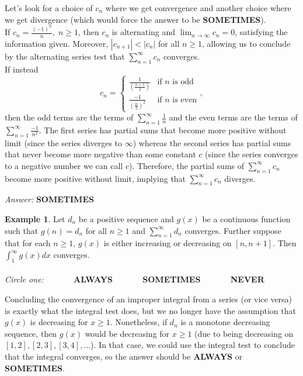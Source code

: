 \documentclass{article}
\theoremstyle{definition} %
\newtheorem{example}{Example} %
\begin{document}
Let's look for a choice of $c_n$ where we get convergence and another choice where we get divergence (which would force the answer to be \textbf{SOMETIMES}). \\ 

If $c_n = \frac{(-1)^n}{n}, \; n \geq 1$, then $c_n$ is alternating and $\displaystyle\lim_{n \to \infty} c_n = 0$, satisfying the information given. Moreover, $|c_{n+1}| < |c_n|$ for all $n \geq 1$, allowing us to conclude by the alternating series test that $\displaystyle\sum_{n=1}^\infty c_n$ converges. \\

If instead $$c_n = 
\begin{cases}
\frac{1}{(\frac{n+1}{2})} & \text{if } n \text{ is odd} \\
\frac{-1}{(\frac{n}{2})^2} & \text{if } n \text{ is even}
\end{cases},
$$
then the odd terms are the terms of $\displaystyle\sum_{n=1}^\infty \frac{1}{n}$ and the even terms are the terms of $\displaystyle\sum_{n=1}^\infty \frac{-1}{n^2}$. The first series has partial sums that become more positive without limit (since the series diverges to $\infty$) whereas the second series has partial sums that never become more negative than some constant $c$ (since the series converges to a negative number we can call $c$). Therefore, the partial sums of $\displaystyle\sum_{n=1}^\infty c_n$ become more positive without limit, implying that $\displaystyle\sum_{n=1}^\infty c_n$ diverges.   

\vspace{15pt}

\textit{Answer:} \textbf{SOMETIMES} \\

\begin{example}
    Let $d_n$ be a positive sequence and $g(x)$ be a continuous function such that $g(n) = d_n$ for all $n \geq 1$ and $\displaystyle\sum_{n=1}^\infty d_n$ converges. Further suppose that for each $n \geq 1$, $g(x)$ is either increasing or decreasing on $[n,n+1]$. Then $\displaystyle\int_1^\infty g(x)dx$ converges. \\\\ 
    \textit{Circle one:} $\quad\quad\quad$ \textbf{ALWAYS} $\quad\quad\quad$ \textbf{SOMETIMES} $\quad\quad\quad$ \textbf{NEVER}  
\end{example}

\vspace{20pt}

Concluding the convergence of an improper integral from a series (or vice versa) is exactly what the integral test does, but we no longer have the assumption that $g(x)$ is decreasing for $x \geq 1$. Nonetheless, if $d_n$ is a monotone decreasing sequence, then $g(x)$ would be decreasing for $x \geq 1$ (due to being decreasing on $[1,2],[2,3],[3,4],\dots$). In that case, we could use the integral test to conclude that the integral converges, so the answer should be \textbf{ALWAYS} or \textbf{SOMETIMES}. \\
\end{document}
